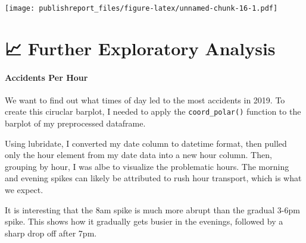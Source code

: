 \documentclass[
]{article}
\begin{document}
\texttt{[image: publishreport\_files/figure-latex/unnamed-chunk-16-1.pdf]}

\hypertarget{further-exploratory-analysis}{%
\section{📈 Further Exploratory
Analysis}\label{further-exploratory-analysis}}

\hypertarget{accidents-per-hour}{%
\paragraph{Accidents Per Hour}\label{accidents-per-hour}}

We want to find out what times of day led to the most accidents in 2019.
To create this ciruclar barplot, I needed to apply the
\texttt{coord\_polar()} function to the barplot of my preprocessed
dataframe.

Using lubridate, I converted my date column to datetime format, then
pulled only the hour element from my date data into a new hour column.
Then, grouping by hour, I was albe to visualize the problematic hours.
The morning and evening spikes can likely be attributed to rush hour
transport, which is what we expect.

It is interesting that the 8am spike is much more abrupt than the
gradual 3-6pm spike. This shows how it gradually gets busier in the
evenings, followed by a sharp drop off after 7pm.
\end{document}

